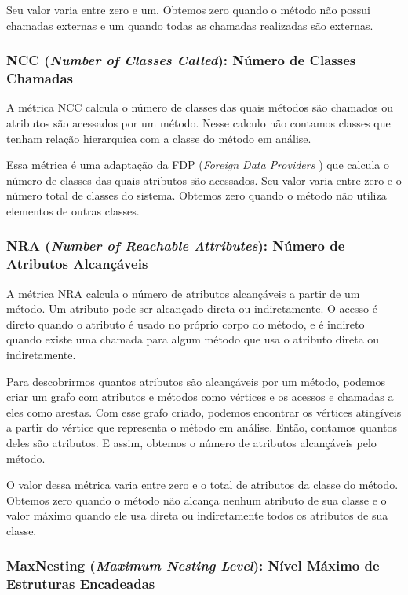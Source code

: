 Seu valor varia entre zero e um. Obtemos zero quando o método não possui chamadas externas e um quando todas as chamadas realizadas são externas.


\subsubsection{NCC (\textit{Number of Classes Called}): Número de Classes Chamadas}              

A métrica NCC calcula o número de classes das quais métodos são chamados ou atributos são acessados por um método. Nesse calculo não contamos classes que tenham relação hierarquica  com a classe do método em análise.

Essa métrica é uma adaptação da FDP (\textit{Foreign Data Providers} \citep{Lanza06}) que calcula o número de classes das quais atributos são acessados. Seu valor varia entre zero e o número total de classes do sistema. Obtemos zero quando o método não utiliza elementos de outras classes.
                                                                 

\subsubsection{NRA (\textit{Number of Reachable Attributes}): Número de Atributos Alcançáveis}

A métrica NRA calcula o número de atributos alcançáveis a partir de um método. Um atributo pode ser alcançado direta ou indiretamente. O acesso é direto quando o atributo é usado no próprio corpo do método, e é indireto quando existe uma chamada para algum método que usa o atributo direta ou indiretamente.
 	          
Para descobrirmos quantos atributos são alcançáveis por um método, podemos criar um grafo com atributos e métodos como vértices e os acessos e chamadas a eles como arestas. Com esse grafo criado, podemos encontrar os vértices atingíveis a partir do vértice que representa o método em análise. Então, contamos quantos deles são atributos. E assim, obtemos o número de atributos alcançáveis pelo método.

O valor dessa métrica varia entre zero e o total de atributos da classe do método. Obtemos zero quando o método não alcança nenhum atributo de sua classe e o valor máximo quando ele usa direta ou indiretamente todos os atributos de sua classe.


\subsubsection{MaxNesting (\textit{Maximum Nesting Level}): Nível Máximo de Estruturas Encadeadas}

